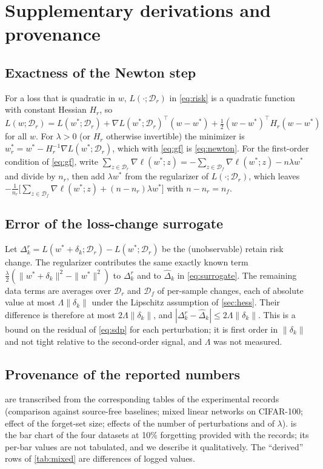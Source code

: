 \documentclass[10pt,twocolumn,letterpaper]{article}
\begin{document}
{
    \small
    
    
}

\appendix
\section{Supplementary derivations and provenance}
\label{sec:appendix}

\subsection{Exactness of the Newton step}
For a loss that is quadratic in $w$, $L(\cdot;\mathcal D_r)$ in \cref{eq:risk} is a quadratic function with constant Hessian $H_r$, so $L(w;\mathcal D_r)=L(w^*;\mathcal D_r)+\nabla L(w^*;\mathcal D_r)^\top(w-w^*)+\frac12(w-w^*)^\top H_r(w-w^*)$ for all $w$. For $\lambda>0$ (or $H_r$ otherwise invertible) the minimizer is $w^*_r=w^*-H_r^{-1}\nabla L(w^*;\mathcal D_r)$, which with \cref{eq:gf} is \cref{eq:newton}. For the first-order condition of \cref{eq:gf}, write $\sum_{z\in\mathcal D_r}\nabla\ell(w^*;z)=-\sum_{z\in\mathcal D_f}\nabla\ell(w^*;z)-n\lambda w^*$ and divide by $n_r$, then add $\lambda w^*$ from the regularizer of $L(\cdot;\mathcal D_r)$, which leaves $-\frac1{n_r}\big[\sum_{z\in\mathcal D_f}\nabla\ell(w^*;z)+(n-n_r)\lambda w^*\big]$ with $n-n_r=n_f$.

\subsection{Error of the loss-change surrogate}
Let $\Delta_k^{r}=L(w^*\!+\!\delta_k;\mathcal D_r)-L(w^*;\mathcal D_r)$ be the (unobservable) retain risk change. The regularizer contributes the same exactly known term $\frac\lambda2(\|w^*\!+\!\delta_k\|^2-\|w^*\|^2)$ to $\Delta_k^r$ and to $\hat\Delta_k$ in \cref{eq:surrogate}. The remaining data terms are averages over $\mathcal D_r$ and $\mathcal D_f$ of per-sample changes, each of absolute value at most $\Lambda\|\delta_k\|$ under the Lipschitz assumption of \cref{sec:hess}. Their difference is therefore at most $2\Lambda\|\delta_k\|$, and $|\Delta_k^r-\hat\Delta_k|\le2\Lambda\|\delta_k\|$. This is a bound on the residual of \cref{eq:sdp} for each perturbation; it is first order in $\|\delta_k\|$ and not tight relative to the second-order signal, and $\Lambda$ was not measured.

\subsection{Provenance of the reported numbers}
 are transcribed from the corresponding tables of the experimental records (comparison against source-free baselines; mixed linear networks on CIFAR-100; effect of the forget-set size; effects of the number of perturbations and of $\lambda$).  is the bar chart of the four datasets at 10\% forgetting provided with the records; its per-bar values are not tabulated, and we describe it qualitatively. The ``derived'' rows of \cref{tab:mixed} are differences of logged values.
\end{document}
